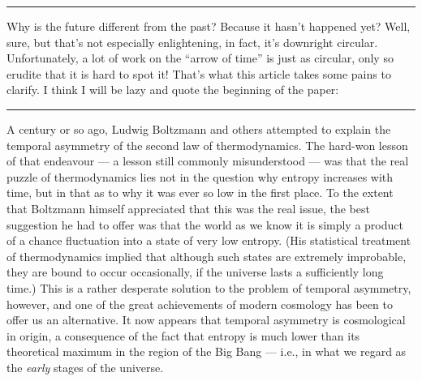 \documentclass{article}
\def\tightlist{}
\renewcommand{\texttt}[1]{%
  \begingroup
  \ttfamily
  \begingroup\lccode`~=`/\lowercase{\endgroup\def~}{/\discretionary{}{}{}}%
  \begingroup\lccode`~=`[\lowercase{\endgroup\def~}{[\discretionary{}{}{}}%
  \begingroup\lccode`~=`.\lowercase{\endgroup\def~}{.\discretionary{}{}{}}%
  \catcode`/=\active\catcode`[=\active\catcode`.=\active
  \scantokens{#1\noexpand}%
  \endgroup
}
\begin{document}
\begin{center}\rule{0.5\linewidth}{0.5pt}\end{center}


Why is the future different from the past? Because it hasn't happened
yet? Well, sure, but that's not especially enlightening, in fact, it's
downright circular. Unfortunately, a lot of work on the ``arrow of
time'' is just as circular, only so erudite that it is hard to spot it!
That's what this article takes some pains to clarify. I think I will be
lazy and quote the beginning of the paper:

\begin{center}\rule{0.5\linewidth}{0.5pt}\end{center}

A century or so ago, Ludwig Boltzmann and others attempted to explain
the temporal asymmetry of the second law of thermodynamics. The hard-won
lesson of that endeavour --- a lesson still commonly misunderstood ---
was that the real puzzle of thermodynamics lies not in the question why
entropy increases with time, but in that as to why it was ever so low in
the first place. To the extent that Boltzmann himself appreciated that
this was the real issue, the best suggestion he had to offer was that
the world as we know it is simply a product of a chance fluctuation into
a state of very low entropy. (His statistical treatment of
thermodynamics implied that although such states are extremely
improbable, they are bound to occur occasionally, if the universe lasts
a sufficiently long time.) This is a rather desperate solution to the
problem of temporal asymmetry, however, and one of the great
achievements of modern cosmology has been to offer us an alternative. It
now appears that temporal asymmetry is cosmological in origin, a
consequence of the fact that entropy is much lower than its theoretical
maximum in the region of the Big Bang --- i.e., in what we regard as the
\emph{early} stages of the universe.
\end{document}
